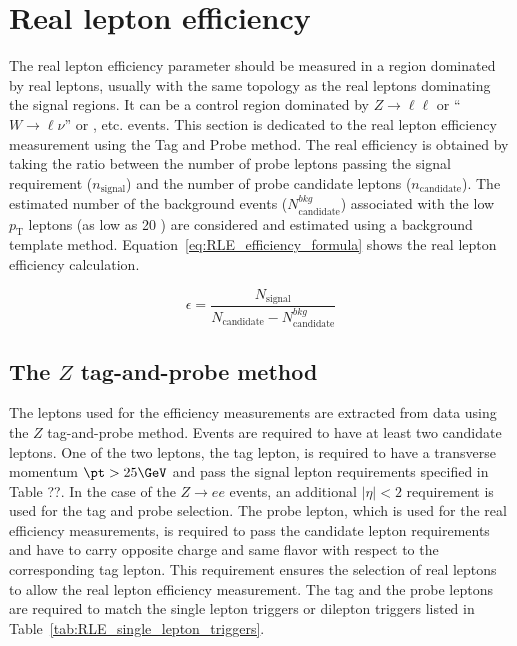 \section{Real lepton efficiency}
\graphicspath{{figures/real_lepton_efficiency/}}
The real lepton efficiency parameter should be measured in a region dominated by real leptons, usually with the same topology as the real leptons dominating the signal regions. It can be a control region dominated by $Z\to\ell\ell$ or ``$W\to\ell\nu$'' or \ttbar, etc. events.
This section is dedicated to the real lepton efficiency measurement using the Tag and Probe method. 
The real efficiency is obtained by taking the ratio between the number of probe leptons passing the signal requirement 
($n_\mathrm{signal}$) and the number of probe candidate leptons ($n_\mathrm{candidate}$).
The estimated number of the background events ($N_\mathrm{candidate}^{bkg}$) associated with the low $p_\mathrm{T}$ leptons 
(as low as 20 \GeV) are considered and estimated using a background template method.
Equation~\ref{eq:RLE_efficiency_formula} shows the real lepton efficiency calculation.

\begin{equation}
\epsilon = \frac{N_{\mathrm{signal}}}{N_{\mathrm{candidate}} - N_{\mathrm{candidate}}^{bkg}}
\label{eq:RLE_efficiency_formula}
\end{equation}

\subsection{The $Z$ tag-and-probe method}
\label{subsubsec:RLE_ZTandP_method}

The leptons used for the efficiency measurements are extracted from data using the $Z$ tag-and-probe method.
Events are required to have at least two candidate leptons.
One of the two leptons, the tag lepton, is required to have a transverse momentum $\pt>25 \GeV$ and pass the signal lepton requirements
specified in Table ??.
In the case of the $Z\to ee$ events, an additional $|\eta|<2$ requirement is used for the tag and probe selection.
The probe lepton, which is used for the real efficiency measurements, is required to pass the candidate lepton requirements and have to 
carry opposite charge and same flavor with respect to the corresponding tag lepton. This requirement ensures the selection of 
real leptons to allow the real lepton efficiency measurement.
The tag and the probe leptons are required to match the single lepton triggers or dilepton triggers listed in 
Table~\ref{tab:RLE_single_lepton_triggers}.

